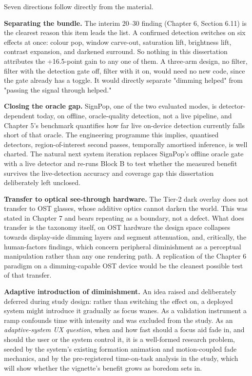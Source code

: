 Seven directions follow directly from the material.

\textbf{Separating the bundle.} The interim 20–30\textdegree{} finding (Chapter 6, Section 6.11) is
the clearest reason this item leads the list. A confirmed detection switches on six effects at once:
colour pop, window carve-out, saturation lift, brightness lift, contrast expansion, and darkened
surround. So nothing in this dissertation attributes the +16.5-point gain to any one of them. A
three-arm design, no filter, filter with the detection gate off, filter with it on, would need no new
code, since the gate already has a toggle. It would directly separate "dimming helped" from "passing
the signal through helped."

\textbf{Closing the oracle gap.} SignPop, one of the two evaluated modes, is detector-dependent today,
on offline, oracle-quality detection, not a live pipeline, and Chapter 5's benchmark quantifies how
far live on-device detection currently falls short of that oracle. The engineering programme this
implies, quantised detectors, region-of-interest second passes, temporally amortised inference, is
well charted. The natural next system iteration replaces SignPop's offline oracle gate with a live
detector and re-runs Block B to test whether the measured benefit survives the live-detection
accuracy and coverage gap this dissertation deliberately left unclosed.

\textbf{Transfer to optical see-through hardware.} The Tier-2 dark overlay does not transfer to OST
glasses, whose additive optics cannot darken the world. This was stated in Chapter 7 and bears
repeating as a boundary, not a defect. What does transfer is the taxonomy itself, on OST hardware
the design space collapses towards display-side dimming layers and segment attenuation, and,
critically, the human-factors findings, which concern peripheral diminishment as a perceptual
manipulation rather than any one rendering path. A replication of the Chapter 6 paradigm on a
dimming-capable OST device would be the cleanest possible test of that transfer.

\textbf{Adaptive introduction of diminishment.} An idea raised and deliberately deferred during study
design: rather than switching the effect on, a deployed system might introduce it gradually as focus
wanes. As a validation instrument a ramp confounds time with intensity and was excluded from the
study. As an \textit{adaptive-system UX question}, when and how fast should a focus aid fade in, and should
the user or the system control it, it is a well-formed research problem, seeded by the system's
existing formation animation and motion-coupled fade mechanics, and by the pre-registered
time-on-task analysis in the study, which will show whether the vignette's benefit grows as boredom
sets in.


